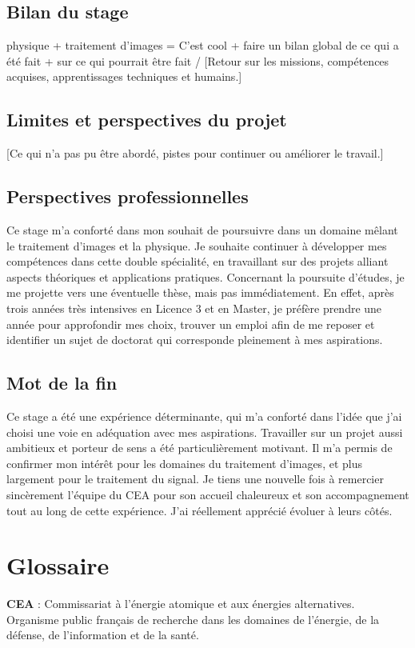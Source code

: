 \documentclass[12pt,a4paper]{report}
\begin{document}
\section{Bilan du stage}
physique + traitement d'images = C'est cool + faire un bilan global de ce qui a été fait + sur ce qui pourrait être fait / [Retour sur les missions, compétences acquises, apprentissages techniques et humains.]



\section{Limites et perspectives du projet}
[Ce qui n’a pas pu être abordé, pistes pour continuer ou améliorer le travail.]

\section{Perspectives professionnelles}
Ce stage m'a conforté dans mon souhait de poursuivre dans un domaine mêlant le traitement d'images et la physique. Je souhaite continuer à développer mes compétences dans cette double spécialité, en travaillant sur des projets alliant aspects théoriques et applications pratiques.  
Concernant la poursuite d'études, je me projette vers une éventuelle thèse, mais pas immédiatement. En effet, après trois années très intensives en Licence 3 et en Master, je préfère prendre une année pour approfondir mes choix, trouver un emploi afin de me reposer et identifier un sujet de doctorat qui corresponde pleinement à mes aspirations.

\section*{Mot de la fin}
Ce stage a été une expérience déterminante, qui m’a conforté dans l’idée que j’ai choisi une voie en adéquation avec mes aspirations. Travailler sur un projet aussi ambitieux et porteur de sens a été particulièrement motivant.
Il m’a permis de confirmer mon intérêt pour les domaines du traitement d’images, et plus largement pour le traitement du signal. Je tiens une nouvelle fois à remercier sincèrement l’équipe du CEA pour son accueil chaleureux et son accompagnement tout au long de cette expérience. J’ai réellement apprécié évoluer à leurs côtés.

\chapter{Glossaire}
\textbf{CEA} : Commissariat à l'énergie atomique et aux énergies alternatives. Organisme public français de recherche dans les domaines de l'énergie, de la défense, de l'information et de la santé.
\end{document}

